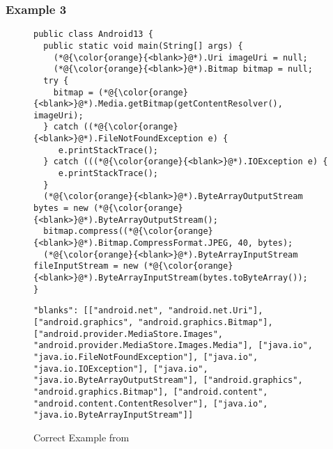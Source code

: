 \subsubsection{Example 3}

\begin{figure}[t]
	\centering
\begin{minipage}{.55\textwidth}
\begin{lstlisting}[label = left3, caption = Example 3]
public class Android13 {
  public static void main(String[] args) {
    (*@{\color{orange}{<blank>}@*).Uri imageUri = null;
    (*@{\color{orange}{<blank>}@*).Bitmap bitmap = null;
  try {
    bitmap = (*@{\color{orange}{<blank>}@*).Media.getBitmap(getContentResolver(), imageUri);
  } catch ((*@{\color{orange}{<blank>}@*).FileNotFoundException e) {
     e.printStackTrace();
  } catch (((*@{\color{orange}{<blank>}@*).IOException e) {
     e.printStackTrace();
  }
  (*@{\color{orange}{<blank>}@*).ByteArrayOutputStream bytes = new (*@{\color{orange}{<blank>}@*).ByteArrayOutputStream();
  bitmap.compress((*@{\color{orange}{<blank>}@*).Bitmap.CompressFormat.JPEG, 40, bytes);
  (*@{\color{orange}{<blank>}@*).ByteArrayInputStream fileInputStream = new (*@{\color{orange}{<blank>}@*).ByteArrayInputStream(bytes.toByteArray());
}
\end{lstlisting}
\end{minipage}
\hspace{2pt}
\begin{minipage}{.42\textwidth}
\begin{lstlisting}[label = right2, caption = Fully-Qualified Names]
"blanks": [["android.net", "android.net.Uri"], ["android.graphics", "android.graphics.Bitmap"], ["android.provider.MediaStore.Images", "android.provider.MediaStore.Images.Media"], ["java.io", "java.io.FileNotFoundException"], ["java.io", "java.io.IOException"], ["java.io", "java.io.ByteArrayOutputStream"], ["android.graphics", "android.graphics.Bitmap"], ["android.content", "android.content.ContentResolver"], ["java.io", "java.io.ByteArrayInputStream"]]
\end{lstlisting}
\end{minipage}  
\vspace{-18pt}
\caption{Correct Example from {\tool}}
\label{eval:example3}
\end{figure}

